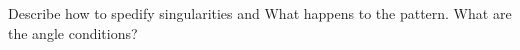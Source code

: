 \documentclass[article.tex]{subfiles}
\begin{document}
Describe how to spedify singularities and What happens to the
pattern. What are the angle conditions?
\end{document}
